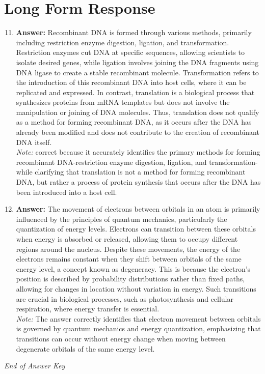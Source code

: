 \documentclass[12pt]{article}
\begin{document}
\section*{Long Form Response}
\begin{enumerate}[label=\arabic*.]
\setcounter{enumi}{10}
\item \textbf{Answer:} Recombinant DNA is formed through various methods, primarily including restriction enzyme digestion, ligation, and transformation. Restriction enzymes cut DNA at specific sequences, allowing scientists to isolate desired genes, while ligation involves joining the DNA fragments using DNA ligase to create a stable recombinant molecule. Transformation refers to the introduction of this recombinant DNA into host cells, where it can be replicated and expressed. In contrast, translation is a biological process that synthesizes proteins from mRNA templates but does not involve the manipulation or joining of DNA molecules. Thus, translation does not qualify as a method for forming recombinant DNA, as it occurs after the DNA has already been modified and does not contribute to the creation of recombinant DNA itself.
\\ \textit{Note:} correct because it accurately identifies the primary methods for forming recombinant DNA-restriction enzyme digestion, ligation, and transformation-while clarifying that translation is not a method for forming recombinant DNA, but rather a process of protein synthesis that occurs after the DNA has been introduced into a host cell.
\item \textbf{Answer:} The movement of electrons between orbitals in an atom is primarily influenced by the principles of quantum mechanics, particularly the quantization of energy levels. Electrons can transition between these orbitals when energy is absorbed or released, allowing them to occupy different regions around the nucleus. Despite these movements, the energy of the electrons remains constant when they shift between orbitals of the same energy level, a concept known as degeneracy. This is because the electron's position is described by probability distributions rather than fixed paths, allowing for changes in location without variation in energy. Such transitions are crucial in biological processes, such as photosynthesis and cellular respiration, where energy transfer is essential.
\\ \textit{Note:} The answer correctly identifies that electron movement between orbitals is governed by quantum mechanics and energy quantization, emphasizing that transitions can occur without energy change when moving between degenerate orbitals of the same energy level.
\end{enumerate}

\vfill
\noindent\textit{End of Answer Key}
\end{document}
